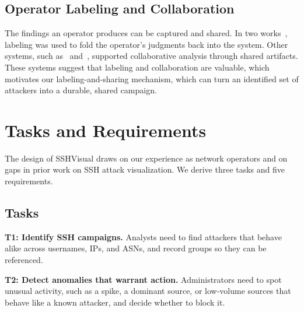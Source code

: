 \documentclass[conference]{IEEEtran}
\begin{document}

\subsection{Operator Labeling and Collaboration}
The findings an operator produces can be captured and shared.
In two works~\cite{guerra2019study, xiao2006enhancing}, labeling was used to fold the operator's judgments back into the system. 
Other systems, such as~\cite{chen2014oceans} and~\cite{goodall2009viassist}, supported collaborative analysis through shared artifacts. 
These systems suggest that labeling and collaboration are valuable,
which motivates our labeling-and-sharing mechanism, which can turn an identified set of attackers into a durable, shared campaign.


\section{Tasks and Requirements}
\label{sec:tasksreqs}

The design of SSHVisual draws on our experience as network operators and on gaps in prior work on SSH attack visualization.
We derive three tasks and five requirements.

\subsection{Tasks}
\label{sec:tasks}

\textbf{T1: Identify SSH campaigns.} Analysts need to find attackers that behave alike across usernames, IPs, and ASNs,
and record groups so they can be referenced.

\textbf{T2: Detect anomalies that warrant action.} Administrators need to spot unusual activity, such as a spike, a 
dominant source, or low-volume sources that behave like a known attacker, and decide whether to block it.
\end{document}
